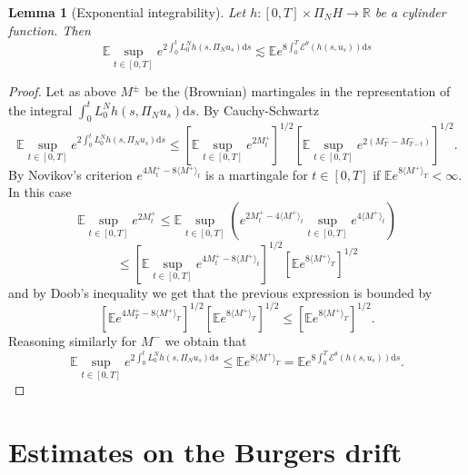 \documentclass[11pt,a4paper,reqno]{amsart}
\newtheorem{lemma}{Lemma}
\newcommand{\RR}{\mathbb{R}}
\newcommand{\expect}{\mathbb{E}}
\newcommand{\cE}{\mathcal{E}}
\newcommand{\dd}{\mathrm{d}}
\begin{document}
\begin{lemma}[Exponential integrability] 
Let  $h : [0,T]\times \Pi_N H \to \RR$ be a cylinder function. Then
\begin{equation}
\label{eq:exp-ito-trick}
\expect \sup_{t\in[0,T]}e^{2 \int_0^t L_0^N h(s,\Pi_N u_s) \dd s} \lesssim 
\expect e^{8 \int_0^T \cE^\theta(h(s,u_s)) \dd s } 
\end{equation}
\end{lemma}
\begin{proof}
Let as above $M^\pm$ be the (Brownian) martingales in the representation of the integral $\int_0^t L_0^N h(s,\Pi_N u_s) \dd s$. By Cauchy-Schwartz
$$
\expect \sup_{t\in[0,T]}e^{2 \int_0^t L_0^N h(s,\Pi_N u_s) \dd s} \le \left[\expect \sup_{t\in[0,T]}e^{2 M^+_t}\right]^{1/2}  \left[\expect \sup_{t\in[0,T]}e^{2 (M^-_T-M^-_{T-t})}\right]^{1/2}.
$$
By  Novikov's criterion 
$
e^{4 M^+_t - 8 \langle M^+\rangle_t }
$ is a martingale for $t\in[0,T]$ if $\expect e^{8 \langle M^+\rangle_T} < \infty$. In this case
$$
\expect \sup_{t\in[0,T]}e^{2 M^+_t} \le \expect \sup_{t\in[0,T]}(e^{2 M^+_t- 4 \langle M^+\rangle_t}\sup_{t\in[0,T]} e^{ 4 \langle M^+\rangle_t })
$$
$$
\le\left[\expect \sup_{t\in[0,T]} e^{4 M^+_t- 8 \langle M^+\rangle_t}\right]^{1/2} \left[\expect e^{8 \langle M^+\rangle_T }\right]^{1/2}
$$
and by Doob's inequality we get that the previous expression is bounded by
$$
\left[\expect e^{4 M^+_T- 8 \langle M^+\rangle_T}\right]^{1/2} \left[\expect e^{8 \langle M^+\rangle_T }\right]^{1/2}
\le \left[\expect e^{8 \langle M^+\rangle_T }\right]^{1/2}.
$$
Reasoning similarly for $M^-$ we obtain that 
$$
\expect \sup_{t\in[0,T]}e^{2 \int_0^t L_0^N h(s,\Pi_N u_s) \dd s} \le \expect e^{8 \langle M^+\rangle_T } = \expect e^{8 \int_0^T \cE^\theta(h(s,u_s)) \dd s }.
$$
\end{proof}

\section{Estimates on the Burgers drift}
\label{sec:estimates}
\end{document}
